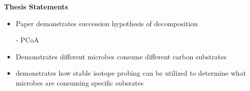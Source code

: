 \textbf{Thesis Statements}
\begin{itemize}
\item Paper demonstrates succession hypothesis of decomposition
     
     - PCoA
\item Demonstrates different microbes consume different carbon substrates
\item demonstrates how stable isotope probing can be utilized to determine what microbes are consuming specific subsrates
\end{itemize}




